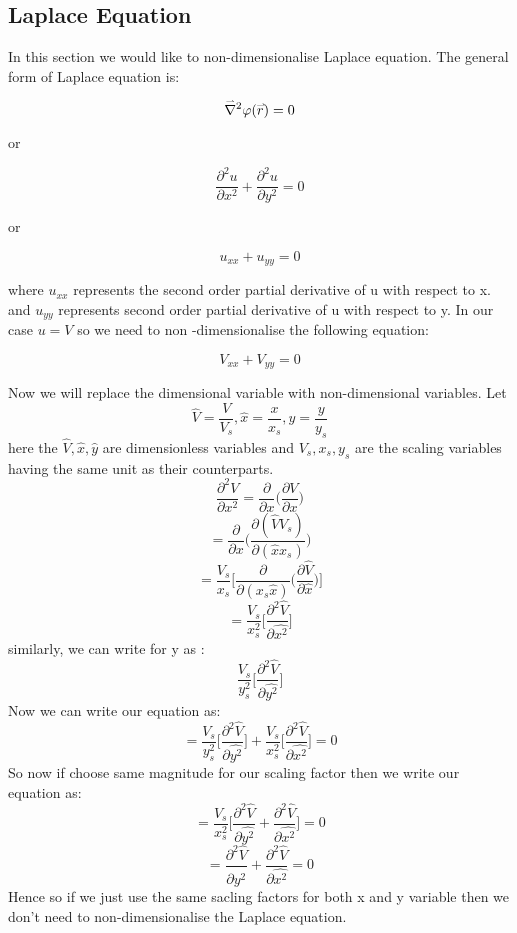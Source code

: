 \documentclass[letterpaper,11pt]{article}
\newcommand{\newsection}[1]{\section{\sffamily{\bfseries{#1}}}}
\newcommand{\myvec}[1]{\accentset{\rightharpoonup}{#1}}
\begin{document}
	\newsection {Non -Dimensionalisation}
		\subsection{Laplace Equation}
		\noindent
		In this section we would like to non-dimensionalise Laplace equation. The general form of Laplace equation is:
		\begin{center}
			$$\myvec{\nabla}^2 \varphi(\myvec{r}) = 0$$
		\end{center}
		\noindent
		or 
		\begin{center}
			\[  
			\frac{\partial^2 u}{\partial x^2} + \frac{\partial^2 u}{\partial y^2} = 0
			\]
		\end{center}
		or 
		\begin{center}
			\[u_{xx} + u_{yy} = 0 \]
		\end{center}
	\noindent
	where \textbf{$ u_{xx} $} represents the second order partial derivative of u with respect to x.
	and $ u_{yy} $ represents second order partial derivative of u with respect to y.
	In our case $ u = V $ so we need to non -dimensionalise the following equation:
	\begin{center}
			\[V_{xx} + V_{yy} = 0 \]
	\end{center}
	\noindent 
	Now we will replace the dimensional variable with non-dimensional variables. Let \[\hat{V} = \frac{V}{V_s},  \hat{x} = \frac{x}{x_s},  \hat{y} = \frac{y}{y_s}\]
	\noindent
	here the $ \hat{V}, \hat{x}, \hat{y} $ are dimensionless variables and $ V_s, x_s, y_s$ are the scaling variables having the same unit as their counterparts.
	\[  
	\frac{\partial^2 V}{\partial x^2} = \frac{\partial}{\partial x} \Bigg({ \frac{\partial V}{\partial x}}\Bigg) \]
	\[ = \frac{\partial}{\partial x} \bigg(\frac{\partial (\hat{V}V_s)}{\partial (\hat{x}x_s)}\bigg) \]
	\[ = \frac{V_s}{x_s} \Big[{\frac{\partial}{\partial (x_s \hat{x})}} \Big({\frac{\partial \hat{V}}{\partial \hat{x}}}\Big)\Big]\]
	\[ = \frac{V_s}{x_s^2} \Big[{\frac{\partial^2 \hat{V}}{\partial \hat{x^2}}}\Big]\]
	\noindent
	similarly, we can write for y as : 
	\[\frac{V_s}{y_s^2} \Big[{\frac{\partial^2 \hat{V}}{\partial \hat{y^2}}}\Big]\]
	\noindent
	Now we can write our equation as:
	\[ = \frac{V_s}{y_s^2} \Big[{\frac{\partial^2 \hat{V}}{\partial \hat{y^2}}}\Big] + \frac{V_s}{x_s^2} \Big[{\frac{\partial^2 \hat{V}}{\partial \hat{x^2}}}\Big] = 0 \]
	So now if choose same magnitude for our scaling factor then we write our equation as:
	\[ = \frac{V_s}{x_s^2} \Big[{\frac{\partial^2 \hat{V}}{\partial \hat{y^2}}} +  {\frac{\partial^2 \hat{V}}{\partial \hat{x^2}}}\Big] = 0 \]
	\[ = {\frac{\partial^2 \hat{V}}{\partial \hat{y^2}}} +  {\frac{\partial^2 \hat{V}}{\partial \hat{x^2}}} = 0 \]
	Hence so if we just use the same sacling factors for both x and y variable then we don't need to non-dimensionalise the Laplace equation.
\end{document}
